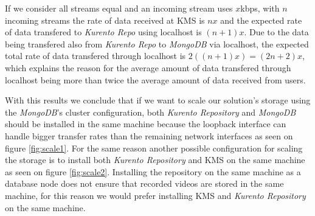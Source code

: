 If we consider all streams equal and an incoming stream uses $x$kbps, with $n$ incoming streams the rate of data received at \ac{KMS} is $nx$ and the expected rate of data transfered to \emph{Kurento Repo} using localhost is $(n+1)x$. Due to the data being transfered also from \emph{Kurento Repo} to \emph{MongoDB} via localhost, the expected total rate of data transfered through localhost is $2((n+1)x) = (2n+2)x$, which explains the reason for the average amount of data transfered through localhost being more than twice the average amount of data received from users.

With this results we conclude that if we want to scale our solution's storage using the \emph{MongoDB}'s cluster configuration, both \emph{Kurento Repository} and \emph{MongoDB} should be installed in the same machine because the loopback interface can handle bigger transfer rates than the remaining network interfaces as seen on figure \ref{fig:scale1}. For the same reason another possible configuration for scaling the storage is to install both \emph{Kurento Repository} and \ac{KMS} on the same machine as seen on figure \ref{fig:scale2}. Installing the repository on the same machine as a database node does not ensure that recorded videos are stored in the same machine, for this reason we would prefer installing \ac{KMS} and \emph{Kurento Repository} on the same machine.

